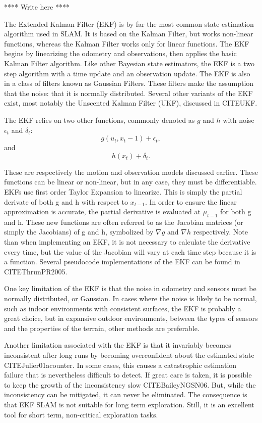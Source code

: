 \documentclass[12pt]{report}
\begin{document}
**** Write here ****

The Extended Kalman Filter (EKF) is by far the most common state estimation algorithm used in SLAM.  It is based on the Kalman Filter, but works non-linear functions, whereas the Kalman Filter works only for linear functions. The EKF begins by linearizing the odometry and observations, then applies the basic Kalman Filter algorithm.  Like other Bayesian state estimators, the EKF is a two step algorithm with a time update and an observation update. The EKF is also in a class of filters known as Gaussian Filters.  These filters make the assumption that the noise: that it is normally distributed.  Several other variants of the EKF exist, most notably the Unscented Kalman Filter (UKF), discussed in CITE{UKF}.

The EKF relies on two other functions, commonly denoted as $g$ and $h$ with noise $\epsilon_t$ and $\delta_t$:
\begin{equation}\label{g}
g(u_t, x_t-1)+\epsilon_t, 
\end{equation}
and 
\begin{equation}\label{h}
h(x_t)+\delta_t.
\end{equation} 

These are respectively the motion and observation models discussed earlier.  These functions can be linear or non-linear, but in any case, they must be differentiable.  EKFs use first order Taylor Expansion to linearize.  This is simply the partial derivate of both g and h with respect to $x_{t-1}$.  In order to ensure the linear approximation is accurate, the partial derivative is evaluated at $\mu_{t-1}$ for both g and h.  These new functions are often referred to as the Jacobian matrices (or simply the Jacobians) of g and h, symbolized by $\nabla g$ and $\nabla h$ respectively.  Note than when implementing an EKF, it is not necessary to calculate the derivative every time, but the value of the Jacobian will vary at each time step because it is a function.  Several pseudocode implementations of the EKF can be found in CITE{ThrunPR2005}.

One key limitation of the EKF is that the noise in odometry and sensors must be normally distributed, or Gaussian.  In cases where the noise is likely to be normal, such as indoor environments with consistent surfaces, the EKF is probably a great choice, but in expansive outdoor environments, between the types of sensors and the properties of the terrain, other methods are preferable.  

Another limitation associated with the EKF is that it invariably becomes inconsistent after long runs by becoming overconfident about the estimated state CITE{Julier01acounter}.  In some cases, this causes a catastrophic estimation failure that is nevertheless difficult to detect.  If great care is taken, it is possible to keep the growth of the inconsistency slow CITE{BaileyNGSN06}.  But, while the inconsistency can be mitigated, it can never be eliminated.  The consequence is that EKF SLAM is not suitable for long term exploration.  Still, it is an excellent tool for short term, non-critical exploration tasks.
\end{document}
